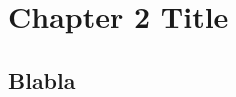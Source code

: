 
\chapter{Chapter 2 Title}
\label{chapter:2}
\minitoc
\newpage
\graphicspath{{2-Chapters/2-Chapter/Images/}}

\section{Blabla}
\label{sec:blabla}

